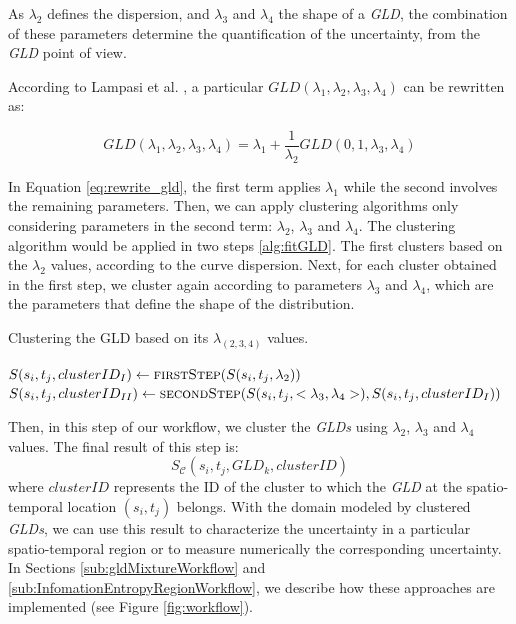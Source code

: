 \documentclass[11pt]{article}
\begin{document}
As $\lambda_{2}$ defines the dispersion, and $\lambda_{3}$ and $\lambda_{4}$ the shape of a \textit{GLD}, the combination of these parameters determine the quantification of the uncertainty, from the \textit{GLD} point of view.


According to Lampasi et al. \cite{Lampasi2006}, a particular $GLD(\lambda_{1},\lambda_{2},\lambda_{3},\lambda_{4})$ can be rewritten as: 

\begin{equation}\label{eq:rewrite_gld}
GLD(\lambda_{1},\lambda_{2},\lambda_{3},\lambda_{4}) = \lambda_{1} + \frac{1}{\lambda_{2}}GLD(0,1,\lambda_{3},\lambda_{4}) 
\end{equation}

In Equation \ref{eq:rewrite_gld}, the first term applies $\lambda_1$ while the second involves the remaining parameters.
Then, we can apply clustering algorithms only considering parameters in the second term: $\lambda_{2}$, $\lambda_{3}$ and $\lambda_{4}$. The clustering algorithm would be applied in two steps \ref{alg:fitGLD}. The first clusters based on the $\lambda_2$ values, according to the curve dispersion. Next, for each cluster obtained in the first step, we cluster again according to parameters $\lambda_{3}$ and $\lambda_{4}$, which are the parameters that define the shape of the distribution.


\begin{algorithm} 
\caption{Clustering the GLD based on its $\lambda_{(2,3,4)}$ values.}\label{alg:clusterGLD}
\begin{algorithmic}[1] 
\State $S(s_{i},t_{j}, clusterID_{I}) \gets \Call {firstStep}{S(s_{i},t_{j},\lambda_{2})}$
\State $S(s_{i},t_{j}, clusterID_{II}) \gets \Call {secondStep}{S(s_{i},t_{j},<\lambda_{3},\lambda_{4}>), S(s_{i},t_{j}, clusterID_{I})}$
\EndFor
\EndFunction 
\end{algorithmic} 
\end{algorithm} 

Then, in this step of our workflow, we cluster the \textit{GLDs} using $\lambda_{2}$, $\lambda_{3}$ and $\lambda_{4}$ values. The final result of this step is:
\begin{equation}
S_{\mathcal{C}}(s_{i},t_{j},GLD_{k},clusterID)
\end{equation}
where
$clusterID$ represents the ID of the cluster to which the \textit{GLD} at the spatio-temporal location $(s_{i},t_{j})$ belongs. With the domain modeled by clustered \textit{GLDs}, we can use this result to characterize the uncertainty in a particular spatio-temporal region or to measure numerically the corresponding uncertainty. In Sections \ref{sub:gldMixtureWorkflow} and \ref{sub:InfomationEntropyRegionWorkflow}, we describe how these approaches are implemented (see Figure \ref{fig:workflow}).
\end{document}
